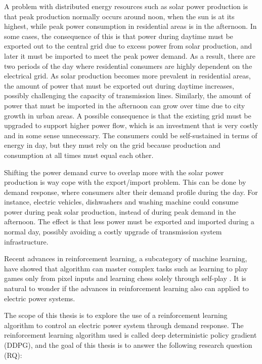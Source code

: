 \documentclass[class=book, crop=false]{standalone}
\begin{document}
A problem with distributed energy resources such as solar power production is that peak production normally occurs around noon, when the sun is at its highest, while peak power consumption in residential areas is in the afternoon. In some cases, the consequence of this is that power during daytime must be exported out to the central grid due to excess power from solar production, and later it must be imported to meet the peak power demand. As a result, there are two periods of the day where residential consumers are highly dependent on the electrical grid. As solar production becomes more prevalent in residential areas, the amount of power that must be exported out during daytime increases, possibly challenging the capacity of transmission lines. Similarly, the amount of power that must be imported in the afternoon can grow over time due to city growth in urban areas. A possible consequence is that the existing grid must be upgraded to support higher power flow, which is an investment that is very costly and in some sense unnecessary. The consumers could be self-sustained in terms of energy in day, but they must rely on the grid because production and consumption at all times must equal each other.

Shifting the power demand curve to overlap more with the solar power production is way cope with the export/import problem. This can be done by demand response, where consumers alter their demand profile during the day. For instance, electric vehicles, dishwashers and washing machine could consume power during peak solar production, instead of during peak demand in the afternoon. The effect is that less power must be exported and imported during a normal day, possibly avoiding a costly upgrade of transmission system infrastructure.

Recent advances in reinforcement learning, a subcategory of machine learning, have showed that algorithm can master complex tasks such as learning to play games only from pixel inputs and learning chess solely through self-play \cite{DQN_Mnih_et_al_2013}\cite{alphazero}. It is natural to wonder if the advances in reinforcement learning also can applied to electric power systems.

The scope of this thesis is to explore the use of a reinforcement learning algorithm to control an electric power system through demand response. The reinforcement learning algorithm used is called deep deterministic policy gradient (DDPG), and the goal of this thesis is to answer the following research question (RQ):
\end{document}
